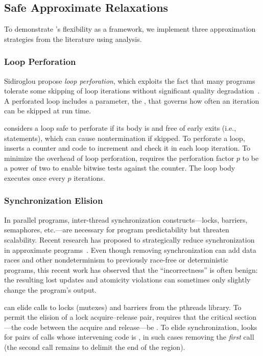 \subsection{Safe Approximate Relaxations}

To demonstrate \sysname's flexibility as a framework, we implement three
approximation strategies from the literature using \precisepurity analysis.

\subsubsection{Loop Perforation}
Sidiroglou \etal propose \emph{loop perforation},
which exploits the fact that many programs tolerate some skipping of loop
iterations without significant quality degradation~\cite{perforation}.
A perforated loop includes a parameter, the , that
governs how often an iteration can be skipped at run time.

\sysname considers a loop safe to perforate if its body is
\precisepure and free of early exits (i.e., 
statements), which can cause nontermination if skipped.
To perforate a loop, \sysname inserts a counter and code to increment and
check it in each loop iteration.
To minimize the overhead of loop perforation, \sysname
requires the perforation factor $p$ to be a power of two to enable bitwise tests
against the counter.  The loop body executes once every $p$ iterations.

\subsubsection{Synchronization Elision}
In parallel programs, inter-thread synchronization constructs---locks,
barriers, semaphores, etc.---are necessary for program predictability but
threaten scalability.
Recent research has proposed
to strategically reduce
synchronization in approximate programs~\cite{rinard-hotpar, quickstep, dubstep, races-ibm}.
Even though removing synchronization can add data races and other
nondeterminism to previously race-free or deterministic programs, this recent
work has observed that the ``incorrectness'' is often benign:
the resulting lost updates and atomicity violations can
sometimes only slightly change the program's output.

\sysname can elide calls to locks (mutexes) and
barriers from the pthreads library.
To permit the elision of a lock
acquire--release pair, \sysname requires that the critical section---the code
between the acquire and release---be \precisepure.
To elide
 synchronization, \sysname looks for pairs of calls
whose intervening code is \precisepure, in such cases removing the \emph{first}
call (the second call remains to delimit the end of the region).

